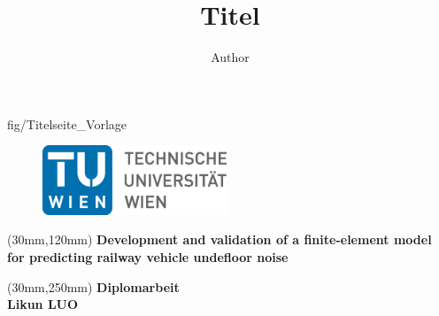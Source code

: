 \author{Author}
\title{Titel}
				
\thispagestyle{empty}							

\TileWallPaper {\paperwidth }{\paperheight } {fig/Titelseite_Vorlage}	%

\begin{flushleft}

	\begin{figure}[htbp]
		\begin{minipage}[b]{.5\linewidth}
			\begin{flushleft}
				\hspace{5mm}
				\includegraphics[width=5.5cm]{fig/TU_Logo}		
			\end{flushleft}
		\end{minipage}
	\end{figure}


 \begin{spacing}{2.5}
     	\begin{textblock*}{14cm}(30mm,120mm)
        \textbf{\Huge Development and validation of a finite-element model for predicting railway vehicle undefloor noise}
	\end{textblock*}
 \end{spacing}

	
	\begin{textblock*}{14cm}(30mm,250mm)
		\textbf{\large Diplomarbeit} \\[3mm]
		\textbf{\huge Likun LUO}
	\end{textblock*}

\end{flushleft}
